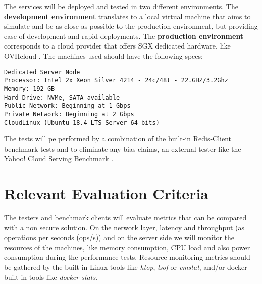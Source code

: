 The services will be deployed and tested in two different environments. The \textbf{development environment} translates to a local virtual machine that aims to simulate and be as close as possible to the production environment, but providing ease of development and rapid deployments. The \textbf{production environment} corresponds to a cloud provider that offers \gls{SGX} dedicated hardware, like OVHcloud \cite{ovhcloud:1}. The machines used should have the following specs:

\lstset{numbers=none, caption=Machine Specifications, label=lst:machine_specs}
\begin{lstlisting}
Dedicated Server Node
Processor: Intel 2x Xeon Silver 4214 - 24c/48t - 22.GHZ/3.2Ghz
Memory: 192 GB
Hard Drive: NVMe, SATA available
Public Network: Beginning at 1 Gbps
Private Network: Beginning at 2 Gbps
CloudLinux (Ubuntu 18.4 LTS Server 64 bits)
\end{lstlisting}

The tests will pe performed by a combination of the built-in Redis-Client benchmark tests \cite{redis_benchmark_cli:1} and to eliminate any bias claims, an external tester like the Yahoo! Cloud Serving Benchmark \cite{yahoo_benchmark:1}.

\section{Relevant Evaluation Criteria} %
\label{sec:relevant_evaluation_criteria}

The testers and benchmark clients will evaluate metrics that can be compared with a non secure solution. On the network layer, latency and throughput (as operations per seconds (ops/s)) and on the server side we will monitor the resources of the machines, like memory consumption, CPU load and also power consumption during the performance tests. Resource monitoring metrics should be gathered by the built in Linux tools like \textit{htop}, \textit{lsof} or \textit{vmstat}, and/or docker built-in tools like \textit{docker stats}.